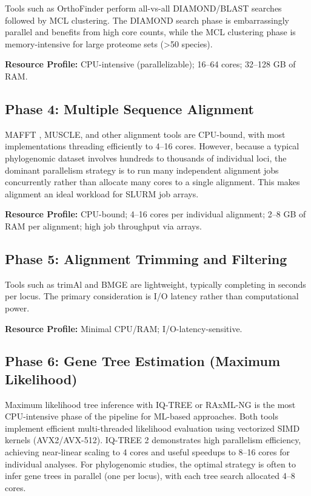Tools such as OrthoFinder \parencite{emms2019} perform all-vs-all DIAMOND/BLAST searches followed by MCL clustering. The DIAMOND search phase is embarrassingly parallel and benefits from high core counts, while the MCL clustering phase is memory-intensive for large proteome sets (>50 species).

\textbf{Resource Profile:} CPU-intensive (parallelizable); 16--64 cores; 32--128 GB of RAM.

\subsection{Phase 4: Multiple Sequence Alignment}

MAFFT \parencite{katoh2013}, MUSCLE, and other alignment tools are CPU-bound, with most implementations threading efficiently to 4--16 cores. However, because a typical phylogenomic dataset involves hundreds to thousands of individual loci, the dominant parallelism strategy is to run many independent alignment jobs concurrently rather than allocate many cores to a single alignment. This makes alignment an ideal workload for SLURM job arrays.

\textbf{Resource Profile:} CPU-bound; 4--16 cores per individual alignment; 2--8 GB of RAM per alignment; high job throughput via arrays.

\subsection{Phase 5: Alignment Trimming and Filtering}

Tools such as trimAl \parencite{capella2009} and BMGE \parencite{criscuolo2010} are lightweight, typically completing in seconds per locus. The primary consideration is I/O latency rather than computational power.

\textbf{Resource Profile:} Minimal CPU/RAM; I/O-latency-sensitive.

\subsection{Phase 6: Gene Tree Estimation (Maximum Likelihood)}

Maximum likelihood tree inference with IQ-TREE \parencite{minh2020} or RAxML-NG \parencite{kozlov2019} is the most CPU-intensive phase of the pipeline for ML-based approaches. Both tools implement efficient multi-threaded likelihood evaluation using vectorized SIMD kernels (AVX2/AVX-512). IQ-TREE 2 demonstrates high parallelism efficiency, achieving near-linear scaling to 4 cores and useful speedups to 8--16 cores for individual analyses. For phylogenomic studies, the optimal strategy is often to infer gene trees in parallel (one per locus), with each tree search allocated 4--8 cores.

